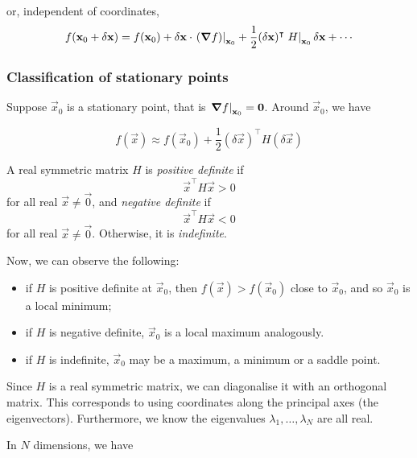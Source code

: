 \documentclass{../../template/note}
\begin{document}
    or, independent of coordinates,
    \begin{align*}
        f(\vec x_0 + \delta \vec x) = f(\vec x_0) + \delta \vec x \cdot \left.(\grad f)\right|_{\vec x_0} + \frac{1}{2} (\delta \vec x)^\intercal \left.H\right|_{\vec x_0} \delta \vec x + \cdots
    \end{align*}
    

    \subsubsection{Classification of stationary points}

    Suppose \(\vec x_0\) is a stationary point, that is \(\left.\grad f\right|_{\vec x_0} = \vec 0\). Around \(\vec x_0\), we have

    \[
        f(\vec x) \approx f(\vec x_0) + \frac{1}{2} (\delta \vec x)^\intercal H (\delta \vec x)
    \]
    
    \begin{definition}
        A real symmetric matrix \(H\) is \emph{positive definite} if
        \[
            \vec x^\intercal H \vec x > 0
        \]
        for all real \(\vec x \neq \vec 0\), and \emph{negative definite} if
        \[
            \vec x^\intercal H \vec x < 0
        \]
        for all real \(\vec x \neq \vec 0\). Otherwise, it is \emph{indefinite}.
    \end{definition}
    
    Now, we can observe the following:
    \begin{itemize}
        \item if \(H\) is positive definite at \(\vec x_0\), then \(f(\vec x) > f(\vec x_0)\) close to \(\vec x_0\), and so \(\vec x_0\) is a local minimum;
        \item if \(H\) is negative definite, \(\vec x_0\) is a local maximum analogously.
        \item if \(H\) is indefinite, \(\vec x_0\) may be a maximum, a minimum or a saddle point.
    \end{itemize}
    
    Since \(H\) is a real symmetric matrix, we can diagonalise it with an orthogonal matrix. This corresponds to using coordinates along the principal axes (the eigenvectors). Furthermore, we know the eigenvalues \(\lambda_1, \dots, \lambda_N\) are all real.

    In \(N\) dimensions, we have
\end{document}
